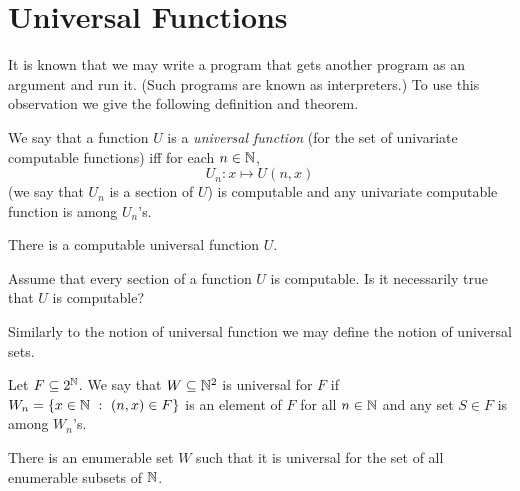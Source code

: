 \chapter{Universal Functions}
It is known that we may write a program that gets another program as an argument
and run it. (Such programs are known as interpreters.) To use this observation
we give the following definition and theorem.
\begin{definition}
  We say that a function $U$ is a \emph{universal function} (for the set of
  univariate computable functions) iff for each $n \in {\mathbb{N}}$,
  \[
    U_n : x \mapsto U(n, x)
  \]
  (we say that $U_n$ is a section of $U$)
  is computable and any univariate computable function is among $U_n$'s.
\end{definition}

\begin{theorem}
\label{theorem:universal-function-computable}
  There is a computable universal function $U$.
\end{theorem}

\begin{exercise}
  Assume that every section of a function $U$ is computable.
  Is it necessarily true that $U$ is computable?
\end{exercise}

Similarly to the notion of universal function we may define the notion
of universal sets.
\begin{definition}
  Let $F \subseteq 2^{\mathbb{N}}$. We say that $W \subseteq {\mathbb{N}}^2$ is universal for $F$
  if $W_n = \set[(n, x) \in F]{x \in \N}$ is an element of $F$ for all
  $n \in {\mathbb{N}}$ and any set $S \in F$ is among $W_n$'s.
\end{definition}

\begin{theorem}
\label{theorem:universal-set-enumerable}
  There is an enumerable set $W$ such that it is universal for the set of
  all enumerable subsets of ${\mathbb{N}}$.
\end{theorem}

